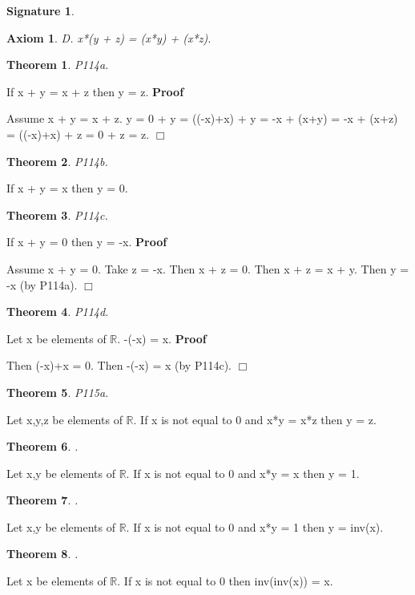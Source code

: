 \documentclass{article}
\newenvironment{forthel}{\begin{leftbar}}{\end{leftbar}}
\newenvironment{proof}{\noindent\textbf{Proof\ }}{\hspace*{\fill}$\Box$\medskip}
\newtheorem{axiom}{Axiom}
\newtheorem{theorem}{Theorem}
\newtheorem{signature}{Signature}
\begin{document}
\begin{forthel}
\begin{signature}
\end{signature}

\begin{axiom} D. x*(y + z) = (x*y) + (x*z).

\end{axiom}



\begin{theorem}
 P114a.
\end{theorem}If x + y = x + z then y = z.
\begin{proof}


Assume x + y = x + z.
y  = 0 + y
= ((-x)+x) + y
= -x + (x+y)
= -x + (x+z)
= ((-x)+x) + z
= 0 + z
= z.
\end{proof}


\begin{theorem}
 P114b.
\end{theorem}If x + y = x then y = 0.
\begin{theorem}
 P114c. 
\end{theorem}If x + y = 0 then y = -x.
\begin{proof}

Assume x + y = 0.
Take z = -x. Then x + z = 0.
Then x + z = x + y. Then y = -x (by P114a).
\end{proof}

\begin{theorem}
 P114d. 
\end{theorem}Let x be elements of $\mathbb{R}$. -(-x) = x.
\begin{proof}

Then (-x)+x = 0.
Then -(-x) = x (by P114c).
\end{proof}



\begin{theorem}
 P115a.
\end{theorem}Let x,y,z be elements of $\mathbb{R}$. If x is not equal to 0 and x*y = x*z then y = z.
\begin{theorem}
.
\end{theorem}Let x,y be elements of $\mathbb{R}$. If x is not equal to 0 and x*y = x then y = 1.
\begin{theorem}
.
\end{theorem}Let x,y be elements of $\mathbb{R}$. If x is not equal to 0 and x*y = 1 then y = inv(x).
\begin{theorem}
.
\end{theorem}Let x be elements of $\mathbb{R}$. If x is not equal to 0 then inv(inv(x)) = x.




\end{forthel}
\end{document}
